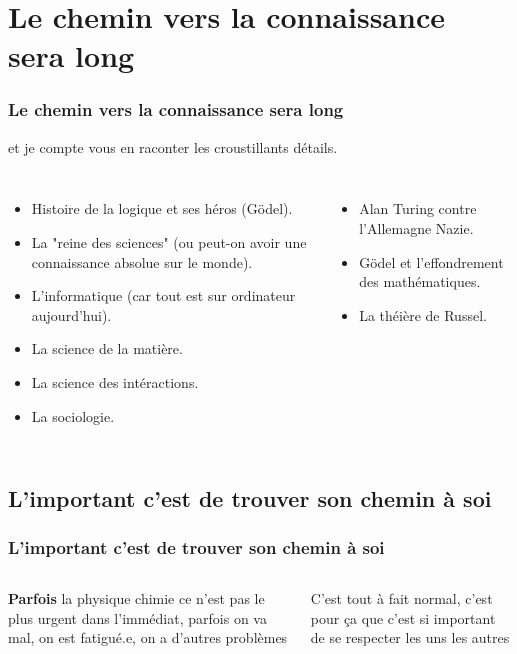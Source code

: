 \documentclass{beamer}
\begin{document}
\section{Le chemin vers la connaissance sera long}
\begin{frame}
\frametitle{Le chemin vers la connaissance sera long}
et je compte vous en raconter les croustillants détails.

\begin{columns}[c] %
    
\begin{itemize}
    \item Histoire de la logique et ses héros (Gödel).
    \item La "reine des sciences" (ou peut-on avoir une connaissance absolue sur le monde).
    \item L'informatique (car tout est sur ordinateur aujourd'hui).
    \item La science de la matière.
    \item La science des intéractions.
    \item La sociologie.
\end{itemize}
\begin{itemize}
    \item Alan Turing contre l'Allemagne Nazie.
    \item Gödel et l'effondrement des mathématiques.
    \item La théière de Russel.
\end{itemize}

\end{columns}
\end{frame}




\subsection{L'important c'est de trouver son chemin à soi}
\begin{frame}
\frametitle{L'important c'est de trouver son chemin à soi}
\begin{columns}[c] %

\textbf{Parfois}
la physique chimie ce n'est pas le plus urgent dans l'immédiat,
parfois on va mal, on est fatigué.e, on a d'autres problèmes

C'est tout à fait normal, c'est pour ça que c'est 
si important de se respecter les uns les autres

\end{columns}

\end{frame}
\end{document}
